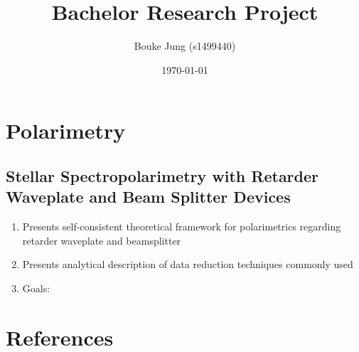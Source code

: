 \documentclass[a4paper]{article}
\title{Bachelor Research Project}
\author{Bouke Jung (s1499440)}
\date{\today}
\begin{document}
\maketitle


\tableofcontents



\section{Polarimetry}
    \subsection{Stellar Spectropolarimetry with Retarder Waveplate and Beam Splitter Devices}
        \begin{enumerate}[I]
            \item Presents self-consistent theoretical framework for polarimetrics regarding retarder waveplate and beamsplitter
            \item Presents analytical description of data reduction techniques commonly used
            \item Goals:
                \subitem 
                \subitem
                \subitem
                \subitem
        \end{enumerate}
            
            
            
            
            
            
            
            






%

\clearpage
\section{References}
\renewcommand\refname{}


\end{document}
